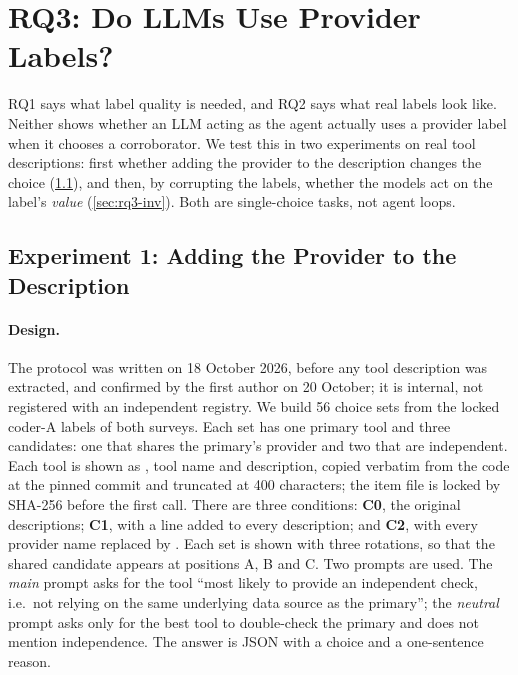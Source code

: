 \section{RQ3: Do LLMs Use Provider Labels?}\label{sec:rq3}

RQ1 says what label quality is needed, and RQ2 says what real labels look like. Neither shows whether an LLM acting as the agent actually uses a provider label when it chooses a corroborator. We test this in two experiments on real tool descriptions: first whether adding the provider to the description changes the choice (\cref{sec:rq3-main}), and then, by corrupting the labels, whether the models act on the label's \emph{value} (\cref{sec:rq3-inv}). Both are single-choice tasks, not agent loops.

\subsection{Experiment 1: Adding the Provider to the Description}\label{sec:rq3-main}

\paragraph{Design.} The protocol was written on 18 October 2026, before any tool description was extracted, and confirmed by the first author on 20 October; it is internal, not registered with an independent registry. We build 56 choice sets from the locked coder-A labels of both surveys. Each set has one primary tool and three candidates: one that shares the primary's provider and two that are independent. Each tool is shown as , tool name and description, copied verbatim from the code at the pinned commit and truncated at 400 characters; the item file is locked by SHA-256 before the first call. There are three conditions: \textbf{C0}, the original descriptions; \textbf{C1}, with a line  added to every description; and \textbf{C2}, with every provider name replaced by \code{[provider]}. Each set is shown with three rotations, so that the shared candidate appears at positions A, B and C. Two prompts are used. The \emph{main} prompt asks for the tool ``most likely to provide an independent check, i.e.\ not relying on the same underlying data source as the primary''; the \emph{neutral} prompt asks only for the best tool to double-check the primary and does not mention independence. The answer is JSON with a choice and a one-sentence reason.

